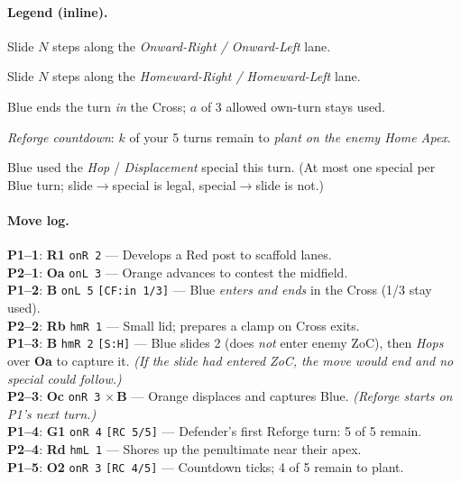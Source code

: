 \documentclass[11pt]{article}
\begin{document}
\paragraph{Legend (inline).}
\begin{description}[leftmargin=2.5em,labelsep=0.6em]
  \item[\texttt{onR N} / \texttt{onL N}] Slide $N$ steps along the \emph{Onward-Right / Onward-Left} lane.
  \item[\texttt{hmR N} / \texttt{hmL N}] Slide $N$ steps along the \emph{Homeward-Right / Homeward-Left} lane.
  \item[\texttt{[CF:in a/3]}] Blue ends the turn \emph{in} the Cross; $a$ of 3 allowed own-turn stays used.
  \item[\texttt{[RC k/5]}] \emph{Reforge countdown}: $k$ of your 5 turns remain to \emph{plant on the enemy Home Apex}.
  \item[\texttt{[S:H]} / \texttt{[S:D]}] Blue used the \emph{Hop} / \emph{Displacement} special this turn. (At most one special per Blue turn; slide$\rightarrow$special is legal, special$\rightarrow$slide is not.)
\end{description}

\paragraph{Move log.}
\noindent\textbf{P1--1}: \textbf{R1} \texttt{onR 2} — Develops a Red post to scaffold lanes.\\
\textbf{P2--1}: \textbf{Oa} \texttt{onL 3} — Orange advances to contest the midfield.\\[2pt]
\textbf{P1--2}: \textbf{B} \texttt{onL 5} \texttt{[CF:in 1/3]} — Blue \emph{enters and ends} in the Cross (1/3 stay used).\\
\textbf{P2--2}: \textbf{Rb} \texttt{hmR 1} — Small lid; prepares a clamp on Cross exits.\\[2pt]
\textbf{P1--3}: \textbf{B} \texttt{hmR 2} \texttt{[S:H]} — Blue slides 2 (does \emph{not} enter enemy ZoC), then \emph{Hops} over \textbf{Oa} to capture it. \emph{(If the slide had entered ZoC, the move would end and no special could follow.)}\\
\textbf{P2--3}: \textbf{Oc} \texttt{onR 3} $\times$\,\textbf{B} — Orange displaces and captures Blue. \emph{(Reforge starts on P1’s next turn.)}\\[2pt]
\textbf{P1--4}: \textbf{G1} \texttt{onR 4} \texttt{[RC 5/5]} — Defender’s first Reforge turn: 5 of 5 remain.\\
\textbf{P2--4}: \textbf{Rd} \texttt{hmL 1} — Shores up the penultimate near their apex.\\
\textbf{P1--5}: \textbf{O2} \texttt{onR 3} \texttt{[RC 4/5]} — Countdown ticks; 4 of 5 remain to plant.\\[4pt]
\end{document}
